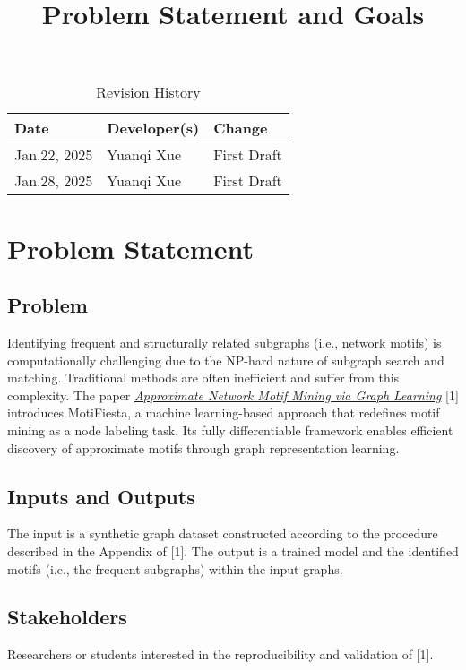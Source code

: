 \documentclass{article}
\title{Problem Statement and Goals}
\author{\authname}
\date{}
\begin{document}
\maketitle

\begin{table}[hp]
\caption{Revision History} \label{TblRevisionHistory}
\begin{tabularx}{\textwidth}{llX}
\toprule
\textbf{Date} & \textbf{Developer(s)} & \textbf{Change}\\
\midrule
Jan.22, 2025 & Yuanqi Xue & First Draft\\
Jan.28, 2025 & Yuanqi Xue & First Draft\\
\bottomrule
\end{tabularx}
\end{table}

\section{Problem Statement}
\subsection{Problem}
Identifying frequent and structurally related subgraphs (i.e., network motifs) is computationally challenging due to the NP-hard nature of subgraph search and matching. Traditional methods are often inefficient and suffer from this complexity. The paper  \href{https://arxiv.org/abs/2206.01008}{\textit{Approximate Network Motif Mining via Graph Learning}} [1] introduces MotiFiesta, a machine learning-based approach that redefines motif mining as a node labeling task. Its fully differentiable framework enables efficient discovery of approximate motifs through graph representation learning.

\subsection{Inputs and Outputs}
The input is a synthetic graph dataset constructed according to the procedure described in the Appendix of [1]. The output is a trained model and the identified motifs (i.e., the frequent subgraphs) within the input graphs.


\subsection{Stakeholders}
Researchers or students interested in the reproducibility and validation of [1].
\end{document}

